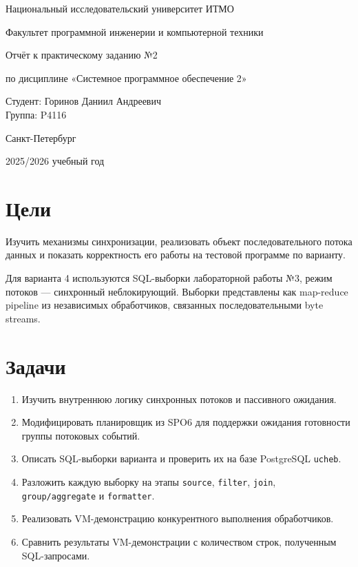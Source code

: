 \documentclass[a4paper,12pt]{article}
\begin{document}
\begin{titlepage}
\centering
{\large Национальный исследовательский университет ИТМО\par}
{\large Факультет программной инженерии и компьютерной техники\par}
\vspace{4cm}
{\large Отчёт к практическому заданию №2\par}
{\large по дисциплине «Системное программное обеспечение 2»\par}
\vfill
\begin{flushright}
Студент: Горинов Даниил Андреевич\\
Группа: P4116
\end{flushright}
\vfill
{Санкт-Петербург}\par
{2025/2026 учебный год\par}
\end{titlepage}

\clearpage
{}

\section{Цели}
Изучить механизмы синхронизации, реализовать объект последовательного потока данных и показать корректность его работы на тестовой программе по варианту.

Для варианта 4 используются SQL-выборки лабораторной работы №3, режим потоков — синхронный неблокирующий. Выборки представлены как map-reduce pipeline из независимых обработчиков, связанных последовательными byte streams.

\section{Задачи}
\begin{enumerate}
\item Изучить внутреннюю логику синхронных потоков и пассивного ожидания.
\item Модифицировать планировщик из SPO6 для поддержки ожидания готовности группы потоковых событий.
\item Описать SQL-выборки варианта и проверить их на базе PostgreSQL \texttt{ucheb}.
\item Разложить каждую выборку на этапы \texttt{source}, \texttt{filter}, \texttt{join}, \texttt{group/aggregate} и \texttt{formatter}.
\item Реализовать VM-демонстрацию конкурентного выполнения обработчиков.
\item Сравнить результаты VM-демонстрации с количеством строк, полученным SQL-запросами.
\end{enumerate}
\end{document}
